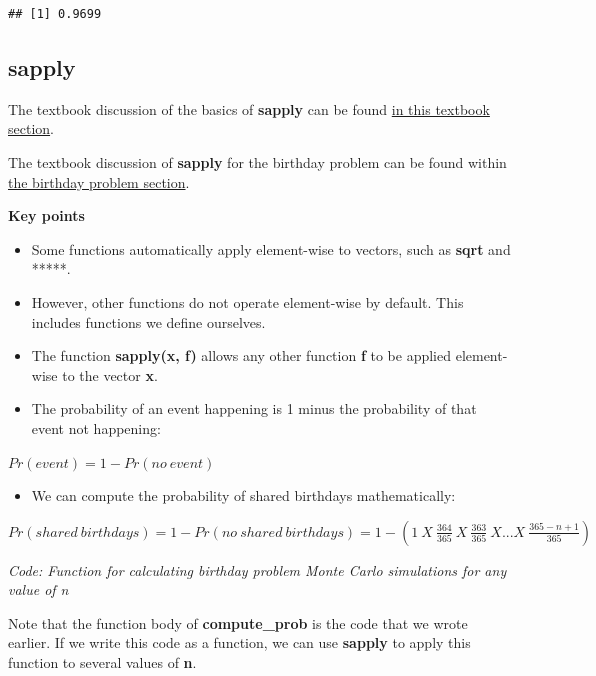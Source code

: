 \documentclass[
]{article}
\providecommand{\tightlist}{%
  \setlength{\itemsep}{0pt}\setlength{\parskip}{0pt}}
\begin{document}
\begin{verbatim}
## [1] 0.9699
\end{verbatim}

\hypertarget{sapply}{%
\subsection{sapply}\label{sapply}}

The textbook discussion of the basics of \textbf{sapply} can be found
\href{https://rafalab.github.io/dsbook/programming-basics.html\#vectorization}{in
this textbook section}.

The textbook discussion of \textbf{sapply} for the birthday problem can
be found within
\href{https://rafalab.github.io/dsbook/probability.html\#birthday-problem}{the
birthday problem section}.

\textbf{Key points}

\begin{itemize}
\tightlist
\item
  Some functions automatically apply element-wise to vectors, such as
  \textbf{sqrt} and *****.
\item
  However, other functions do not operate element-wise by default. This
  includes functions we define ourselves.
\item
  The function \textbf{sapply(x, f)} allows any other function
  \textbf{f} to be applied element-wise to the vector \textbf{x}.
\item
  The probability of an event happening is 1 minus the probability of
  that event not happening:
\end{itemize}

\(Pr(event) = 1 - Pr(no\:event)\)

\begin{itemize}
\tightlist
\item
  We can compute the probability of shared birthdays mathematically:
\end{itemize}

\(Pr(shared\:birthdays) = 1 − Pr(no\:shared\:birthdays) = 1 − (1\:X\: \frac{364}{365}\:X \:\frac{363}{365}\:X...X\: \frac{365−n+1}{365})\)

\emph{Code: Function for calculating birthday problem Monte Carlo
simulations for any value of n}

Note that the function body of \textbf{compute\_prob} is the code that
we wrote earlier. If we write this code as a function, we can use
\textbf{sapply} to apply this function to several values of \textbf{n}.
\end{document}
